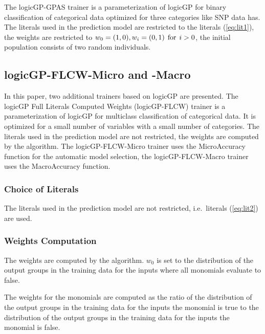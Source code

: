 \documentclass[dvipsnames,format=sigconf,anonymous=false,review=false]{acmart}
\begin{document}
The logicGP-GPAS trainer is a parameterization of logicGP for binary classification of categorical data optimized for three categories like SNP data has. The literals used in the prediction model are restricted to the literals (\ref{eq:lit1}), the weights are restricted to $w_0=(1,0),w_i=(0,1)\hspace*{1ex}\text{for}\hspace*{1ex}i>0$, the initial population consists of two random individuals. 

\subsection{logicGP-FLCW-Micro and -Macro}

In this paper, two additional trainers based on logicGP are presented. The logicGP Full Literals Computed Weights (logicGP-FLCW) trainer is a parameterization of logicGP for multiclass classification of categorical data. It is optimized for a small number of variables with a small number of categories. The literals used in the prediction model are not restricted, the weights are computed by the algorithm. The logicGP-FLCW-Micro trainer uses the MicroAccuracy function for the automatic model selection, the logicGP-FLCW-Macro trainer uses the MacroAccuracy function.

\subsubsection{Choice of Literals}

The literals used in the prediction model are not restricted, i.e.\ literals (\ref{eq:lit2}) are used. 

\subsubsection{Weights Computation}

The weights are computed by the algorithm. $w_0$ is set to the distribution of the output groups in the training data for the inputs where all monomials evaluate to false. 

The weights for the monomials are computed as the ratio of the distribution of the output groups in the training data for the inputs the monomial is true to the distribution of the output groups in the training data for the inputs the monomial is false.
\end{document}
